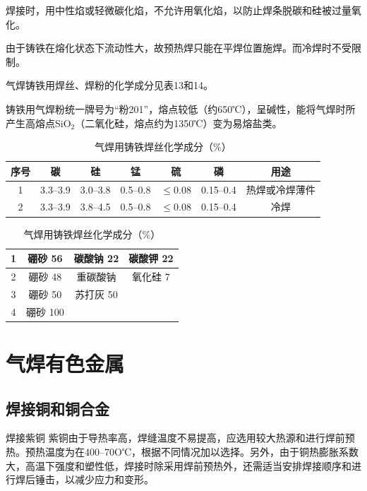 \documentclass{ctexbook}
\begin{document}
焊接时，用中性焰或轻微碳化焰，不允许用氧化焰，以防止焊条脱碳和硅被过量氧化。

由于铸铁在熔化状态下流动性大，故预热焊只能在平焊位置施焊。而冷焊时不受限制。

气焊铸铁用焊丝、焊粉的化学成分见表13和14。

铸铁用气焊粉统一牌号为“粉201”，熔点较低（约650℃），呈碱性，能将气焊时所产生高熔点SiO$_2$（二氧化硅，熔点约为1350℃）变为易熔盐类。
\begin{table}[htbp]
	\centering
	\caption{气焊用铸铁焊丝化学成分（\%）}
	\begin{tabular}{c|c|c|c|c|c|c}
		\hline
	 序号&碳&硅&锰&硫&磷&用途 \\ \hline
		1&3.3--3.9&3.0--3.8&0.5--0.8&$\leqslant0.08$&0.15--0.4&热焊或冷焊薄件\\ \hline
		2&3.3--3.9&3.8--4.5&0.5--0.8&$\leqslant$0.08&0.15--0.4&冷焊		  \\ \hline
	\end{tabular}%
	\label{tab:qihanzhutie}%
\end{table}%



\begin{table}[htbp]
	\centering
	\caption{气焊用铸铁焊丝化学成分（\%）}
	\begin{tabular}{c|c|c|c}
		\hline
	1&硼砂 56& 碳酸钠 22& 碳酸钾 22\\ \hline
	2&硼砂 48&重碳酸钠\footnotemark 45&氧化硅 7\\ \hline
	3&硼砂 50&苏打灰 50 \footnotemark&\\ \hline
	4&硼砂 100&&\\ \hline
	\end{tabular}%
	\label{tab:qihanfen}%
\end{table}%
\section{气焊有色金属}
\subsection{焊接铜和铜合金}
焊接紫铜
紫铜由于导热率高，焊缝温度不易提高，应选用较大热源和进行焊前预热。预热温度为在400--70O℃，根据不同情况加以选择。另外，由于铜热膨胀系数大，高温下强度和塑性低，焊接时除采用焊前预热外，还需适当安排焊接顺序和进行焊后锤击，以减少应力和变形。
\end{document}
